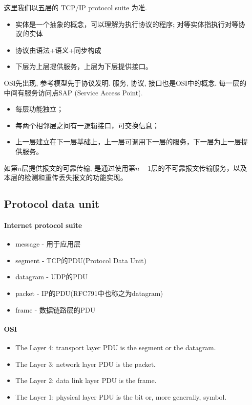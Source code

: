 \documentclass[a4paper]{report}
\begin{document}
这里我们以五层的 TCP/IP protocol suite 为准. 
\begin{itemize}
  \item  实体是一个抽象的概念，可以理解为执行协议的程序; 对等实体指执行对等协议的实体
  \item 协议由语法+语义+同步构成 
  \item 下层为上层提供服务，上层为下层提供接口。
\end{itemize}
OSI先出现, 参考模型先于协议发明. 服务, 协议, 接口也是OSI中的概念. 每一层的中间有服务访问点SAP (Service Access Point). 


\begin{itemize}
  \item 每层功能独立；
  \item 每两个相邻层之间有一逻辑接口，可交换信息；
  \item 上一层建立在下一层基础上，上一层可调用下一层的服务，下一层为上一层提供服务。
\end{itemize}
如第$n$层提供报文的可靠传输, 是通过使用第$n-1$层的不可靠报文传输服务，以及本层的检测和重传丢失报文的功能实现。

\subsection{Protocol data unit}
\paragraph{Internet protocol suite}
\begin{itemize}
  \item message - 用于应用层
  \item segment - TCP的PDU(Protocol Data Unit)
  \item datagram - UDP的PDU
  \item packet - IP的PDU(RFC791中也称之为datagram)
  \item frame - 数据链路层的PDU
\end{itemize}

\paragraph{OSI}
\begin{itemize}
\item The Layer 4: transport layer PDU is the segment or the datagram.
\item The Layer 3: network layer PDU is the packet.
\item The Layer 2: data link layer PDU is the frame.
\item The Layer 1: physical layer PDU is the bit or, more generally, symbol.
\end{itemize}
\end{document}
